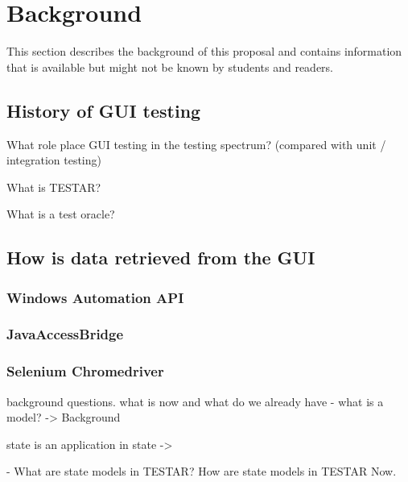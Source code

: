 \section{Background} \label{background}
This section describes the background of this proposal and contains information that is available but might not be known by students and readers.
\subsection{History of GUI testing}

What role place GUI testing in the testing spectrum? (compared with unit / integration testing)

What is TESTAR?

What is a test oracle?


\subsection{How is data retrieved from the GUI}
\subsubsection{Windows Automation API}
\subsubsection{JavaAccessBridge}
\subsubsection{Selenium Chromedriver}

background questions. what is now and what do we already have
- what is a model? -> Background

state is an application in state -> 

- What are state models in TESTAR?
How are state models in TESTAR Now.
